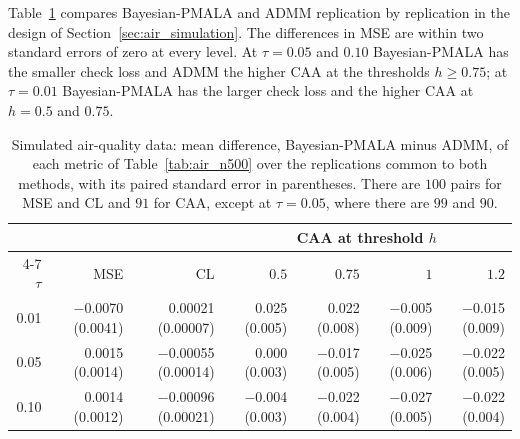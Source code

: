 Table~\ref{tab:air_paired} compares Bayesian-PMALA and ADMM replication by replication in the design of Section~\ref{sec:air_simulation}. The differences in MSE are within two standard errors of zero at every level. At $\tau = 0.05$ and $0.10$ Bayesian-PMALA has the smaller check loss and ADMM the higher CAA at the thresholds $h \ge 0.75$; at $\tau = 0.01$ Bayesian-PMALA has the larger check loss and the higher CAA at $h = 0.5$ and $0.75$.

\begin{table}[tbp]
\centering
\footnotesize
\setlength{\tabcolsep}{2.5pt}
\caption{Simulated air-quality data: mean difference, Bayesian-PMALA minus ADMM, of each metric of Table~\ref{tab:air_n500} over the replications common to both methods, with its paired standard error in parentheses. There are $100$ pairs for MSE and CL and $91$ for CAA, except at $\tau = 0.05$, where there are $99$ and $90$.}
\label{tab:air_paired}
\begin{tabular}{@{}rrrrrrr@{}}
\toprule
 & & & \multicolumn{4}{c}{CAA at threshold $h$} \\
\cmidrule(l){4-7}
$\tau$ & MSE & CL & $0.5$ & $0.75$ & $1$ & $1.2$ \\
\midrule
0.01 & $-$0.0070 (0.0041) & 0.00021 (0.00007) & 0.025 (0.005) & 0.022 (0.008) & $-$0.005 (0.009) & $-$0.015 (0.009) \\
0.05 & 0.0015 (0.0014) & $-$0.00055 (0.00014) & 0.000 (0.003) & $-$0.017 (0.005) & $-$0.025 (0.006) & $-$0.022 (0.005) \\
0.10 & 0.0014 (0.0012) & $-$0.00096 (0.00021) & $-$0.004 (0.003) & $-$0.022 (0.004) & $-$0.027 (0.005) & $-$0.022 (0.004) \\
\bottomrule
\end{tabular}
\end{table}
